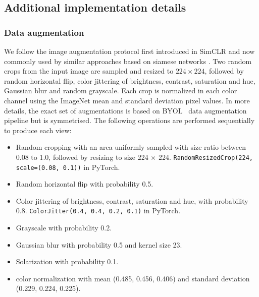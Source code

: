 \documentclass{article}
\begin{document}
\clearpage



















\subsection{Additional implementation details} \label{app:sec_impl_details}

\subsubsection{Data augmentation} \label{app:data_aug}

We follow the image augmentation protocol first introduced in SimCLR \cite{chen2020simclr} and now commonly used by similar approaches based on siamese networks \cite{caron2020swav, grill2020byol, chen2020simsiam, zbontar2021barlow}. Two random crops from the input image are sampled and resized to $224 \times 224$, followed by random horizontal flip, color jittering of brightness, contrast, saturation and hue, Gaussian blur and random grayscale. Each crop is normalized in each color channel using the ImageNet mean and standard deviation pixel values.
In more details, the exact set of augmentations is based on BYOL~\cite{grill2020byol} data augmentation pipeline but is symmetrised. The following operations are performed sequentially to produce each view:
\begin{itemize}
    \item Random cropping with an area uniformly sampled with size ratio between 0.08 to 1.0, followed by resizing to size 224 $\times$ 224. \texttt{RandomResizedCrop(224, scale=(0.08, 0.1))} in PyTorch.
    \item Random horizontal flip with probability 0.5.
    \item Color jittering of brightness, contrast, saturation and hue, with probability 0.8. \texttt{ColorJitter(0.4, 0.4, 0.2, 0.1)} in PyTorch.
    \item Grayscale with probability 0.2.
    \item Gaussian blur with probability 0.5 and kernel size 23.
    \item Solarization with probability 0.1.
    \item color normalization with mean (0.485, 0.456, 0.406) and standard deviation (0.229, 0.224, 0.225).
\end{itemize}
\end{document}
